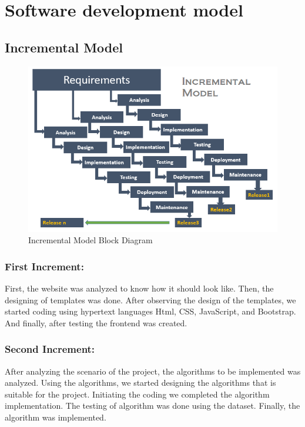 \section{Software development model}
\subsection{Incremental Model}
\begin{figure}[H]
	\centering
	\includegraphics[width=160mm]{images/incremental model.png}{}
	\caption{Incremental Model Block Diagram} %
	\label{figincremental} %
\end{figure}

\subsubsection{First Increment:}
First, the website was analyzed to know how it should look like. 
Then, the designing of templates was done. After observing the design of the 
templates, we started coding using hypertext languages Html, CSS, JavaScript, and Bootstrap. 
And finally, after testing the frontend was created.

\subsubsection{Second Increment:}
After analyzing the scenario of the project, the algorithms to be 
implemented was analyzed. Using the algorithms, we started designing 
the algorithms that is suitable for the project. Initiating the coding we 
completed the algorithm implementation. The testing of algorithm was done using the dataset. 
Finally, the algorithm was implemented.


